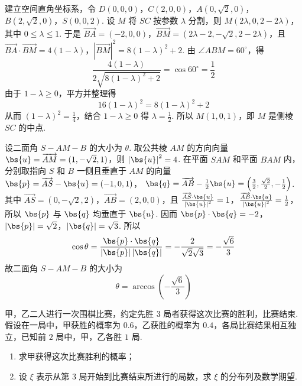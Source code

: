 \begin{solution}
建立空间直角坐标系，令 \(D(0,0,0)\)，\(C(2,0,0)\)，\(A(0,\sqrt{2},0)\)，\(B(2,\sqrt{2},0)\)，\(S(0,0,2)\).
设 \(M\) 将 \(SC\) 按参数 \(\lambda\) 分割，则 \(M\left(2\lambda,0,2-2\lambda\right)\)，其中 \(0\leqslant\lambda\leqslant1\).
于是 \(\overrightarrow{BA}=(-2,0,0)\)，\(\overrightarrow{BM}=\left(2\lambda-2,-\sqrt{2},2-2\lambda\right)\)，且 \(\overrightarrow{BA}\cdot\overrightarrow{BM}=4(1-\lambda)\)，\(\left|\overrightarrow{BM}\right|^2=8(1-\lambda)^2+2\).
由 \(\angle ABM=60^\circ\)，得
\[
\frac{4(1-\lambda)}{2\sqrt{8(1-\lambda)^2+2}}=\cos60^\circ=\frac{1}{2}
\]
由于 \(1-\lambda\geqslant0\)，平方并整理得
\[
16(1-\lambda)^2=8(1-\lambda)^2+2
\]
从而 \((1-\lambda)^2=\frac{1}{4}\)，结合 \(1-\lambda\geqslant0\) 得 \(\lambda=\frac{1}{2}\).
所以 \(M(1,0,1)\)，即 \(M\) 是侧棱 \(SC\) 的中点.

设二面角 \(S-AM-B\) 的大小为 \(\theta\). 取公共棱 \(AM\) 的方向向量 \(\bs{u}=\overrightarrow{AM}=(1,-\sqrt{2},1)\)，则 \(\left|\bs{u}\right|^2=4\).
在平面 \(SAM\) 和平面 \(BAM\) 内，分别取指向 \(S\) 和 \(B\) 一侧且垂直于 \(AM\) 的向量
\(\bs{p}=\overrightarrow{AS}-\bs{u}=(-1,0,1)\)，
\(\bs{q}=\overrightarrow{AB}-\frac{1}{2}\bs{u}=\left(\frac{3}{2},\frac{\sqrt{2}}{2},-\frac{1}{2}\right)\).
其中 \(\overrightarrow{AS}=(0,-\sqrt{2},2)\)，\(\overrightarrow{AB}=(2,0,0)\)，且 \(\frac{\overrightarrow{AS}\cdot\bs{u}}{\left|\bs{u}\right|^2}=1\)，\(\frac{\overrightarrow{AB}\cdot\bs{u}}{\left|\bs{u}\right|^2}=\frac{1}{2}\)，所以 \(\bs{p}\) 与 \(\bs{q}\) 均垂直于 \(\bs{u}\). 因而 \(\bs{p}\cdot\bs{q}=-2\)，\(\left|\bs{p}\right|=\sqrt{2}\)，\(\left|\bs{q}\right|=\sqrt{3}\).
所以
\[
\cos\theta=\frac{\bs{p}\cdot\bs{q}}{\left|\bs{p}\right|\left|\bs{q}\right|}
=-\frac{2}{\sqrt{2}\sqrt{3}}=-\frac{\sqrt{6}}{3}
\]
故二面角 \(S-AM-B\) 的大小为
\[
\theta=\arccos\left(-\frac{\sqrt{6}}{3}\right)
\]
\end{solution}

\begin{problem}
甲，乙二人进行一次围棋比赛，约定先胜 \(3\text{ 局}\)者获得这次比赛的胜利，比赛结束. 假设在一局中，甲获胜的概率为 \(0.6\)，乙获胜的概率为 \(0.4\)，各局比赛结果相互独立，已知前 \(2\text{ 局}\)中，甲，乙各胜 \(1\text{ 局}\).
\begin{enumerate}
\item 求甲获得这次比赛胜利的概率；
\item 设 \(\xi\) 表示从第 \(3\text{ 局}\)开始到比赛结束所进行的局数，求 \(\xi\) 的分布列及数学期望.
\end{enumerate}
\end{problem}

